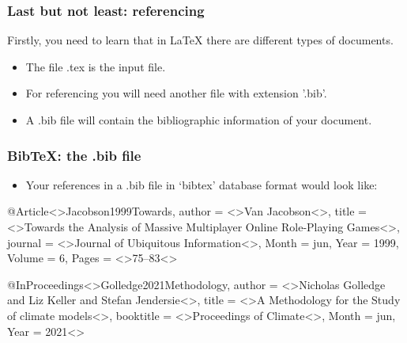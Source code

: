 \documentclass{beamer}
\def\openesc{\color{blue}}
\def\closeesc{\color{black}}
\def\vbdelim{\catcode`<=\active\catcode`>=\active%
\def<{\openesc}
\def>{\closeesc}}
\begin{document}
\begin{frame}[fragile]
\frametitle{Last but not least: referencing}
Firstly, you need to learn that in \LaTeX{} there are different types of documents. 
\begin{itemize}
\item The file .tex is the input file. \\
\item For referencing you will need another file with extension '.bib'. \\
\item A .bib file will contain the bibliographic information of your document. \\
\end{itemize}
\end{frame}

\begingroup
\footnotesize
\begin{frame}[fragile]
\frametitle{BibTeX: the .bib file}
\begin{itemize}
\item Your references in a .bib file in ‘bibtex’ database format would look like:
\end{itemize}
\begin{framed}
\begin{verbnobox}[\vbdelim]
@Article<{>Jacobson1999Towards,
author = <{>Van Jacobson<}>,
title = <{>Towards the Analysis of Massive Multiplayer Online
Role-Playing Games<}>,
journal = <{>Journal of Ubiquitous Information<}>,
Month = jun,
Year = 1999,
Volume = 6,
Pages = <{>75--83<}}>
\end{verbnobox}

\begin{verbnobox}[\vbdelim]
@InProceedings<{>Golledge2021Methodology,
author = <{>Nicholas Golledge and Liz Keller and
Stefan Jendersie<}>,
title = <{>A Methodology for the Study of
climate models<}>,
booktitle = <{>Proceedings of Climate<}>,
Month = jun,
Year = 2021<}>
\end{verbnobox}
\end{framed}
\end{frame}
\end{document}
